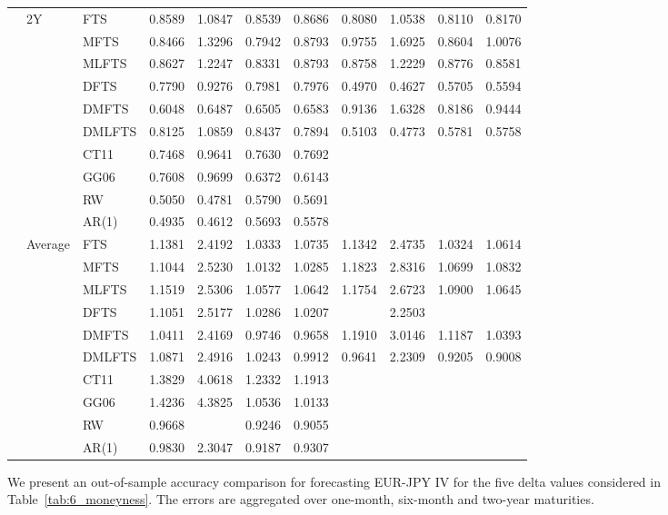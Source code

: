 \documentclass[12pt,a4paper]{article}
\def\textBF#1{\sbox\CBox{#1}\resizebox{\wd\CBox}{\ht\CBox}{\textbf{#1}}}
\begin{document}
\begin{center}
\begin{small}
\begin{longtable}{@{}lllcccccccc@{}}
  \cmidrule{2-11}
    & 2Y & FTS & 0.8589 & 1.0847 & 0.8539 & 0.8686 & 0.8080 & 1.0538 & 0.8110 & 0.8170 \\
& & MFTS & 0.8466 & 1.3296 & 0.7942 & 0.8793 & 0.9755 & 1.6925 & 0.8604 & 1.0076 \\
& & MLFTS & 0.8627 & 1.2247 & 0.8331 & 0.8793 & 0.8758 & 1.2229 & 0.8776 & 0.8581 \\
& & DFTS & 0.7790 & 0.9276 & 0.7981 & 0.7976 & 0.4970 & 0.4627 & 0.5705 & 0.5594 \\ 
& & DMFTS & 0.6048 & 0.6487 & 0.6505 & 0.6583 & 0.9136 & 1.6328 & 0.8186 & 0.9444 \\
& & DMLFTS & 0.8125 & 1.0859 & 0.8437 & 0.7894 & 0.5103 & 0.4773 & 0.5781 & 0.5758 \\
& & CT11 & 0.7468 & 0.9641 & 0.7630 & 0.7692 \\
& & GG06 & 0.7608 & 0.9699 & 0.6372 & 0.6143 \\
& & RW & 0.5050 & 0.4781 & 0.5790 & 0.5691 \\
& & AR(1) & 0.4935 & 0.4612 & 0.5693 & 0.5578 \\
  \cmidrule{2-11}
  & Average & FTS & 1.1381 & 2.4192 & 1.0333 & 1.0735 & 1.1342 & 2.4735 & 1.0324 & 1.0614 \\
  & & MFTS & 1.1044 & 2.5230 & 1.0132 & 1.0285 & 1.1823 & 2.8316 & 1.0699 & 1.0832 \\
  & & MLFTS & 1.1519 & 2.5306 & 1.0577 & 1.0642 & 1.1754 & 2.6723 & 1.0900 & 1.0645 \\
  & & DFTS & 1.1051 & 2.5177 & 1.0286 & 1.0207 & \textBF{0.9629} & 2.2503 & \textBF{0.9173} & \textBF{0.8998} \\
  & & DMFTS & 1.0411 & 2.4169 & 0.9746 & 0.9658 & 1.1910 & 3.0146 & 1.1187 & 1.0393 \\
  & & DMLFTS & 1.0871 & 2.4916 & 1.0243 & 0.9912 & 0.9641 & 2.2309 & 0.9205 & 0.9008 \\
  & & CT11 & 1.3829 & 4.0618 & 1.2332 & 1.1913 \\
  & & GG06 & 1.4236 & 4.3825 & 1.0536 & 1.0133 \\
  & & RW & 0.9668 & \textBF{2.2240} & 0.9246 & 0.9055 \\  
  & & AR(1) & 0.9830 & 2.3047 & 0.9187 & 0.9307 \\
  \bottomrule
\end{longtable}
\end{small}
\end{center}

We present an out-of-sample accuracy comparison for forecasting EUR-JPY IV for the five delta values considered in Table~\ref{tab:6_moneyness}. The errors are aggregated over one-month, six-month and two-year maturities. 
\end{document}
